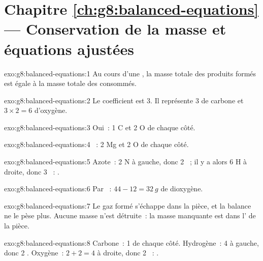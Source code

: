 \section*{Chapitre \ref{ch:g8:balanced-equations} --- Conservation de la masse et équations ajustées}

\begin{solution}{exo:g8:balanced-equations:1}
Au cours d'une , la masse totale des produits formés
est égale à la masse totale des  consommés.
\end{solution}

\begin{solution}{exo:g8:balanced-equations:2}
Le coefficient est 3. Il représente 3  de carbone et
$3 \times 2 = 6$  d'oxygène.
\end{solution}

\begin{solution}{exo:g8:balanced-equations:3}
Oui~: 1 C et 2 O de chaque côté.
\end{solution}

\begin{solution}{exo:g8:balanced-equations:4}
~: 2 Mg et 2 O de chaque côté.
\end{solution}

\begin{solution}{exo:g8:balanced-equations:5}
Azote~: 2 N à gauche, donc 2 ~; il y a alors 6 H à droite, donc
3 ~: .
\end{solution}

\begin{solution}{exo:g8:balanced-equations:6}
Par ~: $44 - 12 = \qty{32}{g}$ de dioxygène.
\end{solution}

\begin{solution}{exo:g8:balanced-equations:7}
Le gaz formé s'échappe dans la pièce, et la balance ne le pèse plus.
Aucune masse n'est détruite~: la masse manquante est dans l' de la
pièce.
\end{solution}

\begin{solution}{exo:g8:balanced-equations:8}
Carbone~: 1 de chaque côté. Hydrogène~: 4 à gauche, donc 2 .
Oxygène~: $2 + 2 = 4$ à droite, donc 2 ~:
.
\end{solution}

